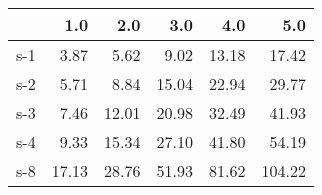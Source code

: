 \begin{tabular}{lrrrrr}
\toprule
{} &   1.0 &   2.0 &   3.0 &   4.0 &    5.0 \\
\midrule
s-1 &  3.87 &  5.62 &  9.02 & 13.18 &  17.42 \\
s-2 &  5.71 &  8.84 & 15.04 & 22.94 &  29.77 \\
s-3 &  7.46 & 12.01 & 20.98 & 32.49 &  41.93 \\
s-4 &  9.33 & 15.34 & 27.10 & 41.80 &  54.19 \\
s-8 & 17.13 & 28.76 & 51.93 & 81.62 & 104.22 \\
\bottomrule
\end{tabular}

